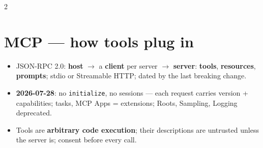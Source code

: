 \documentclass[8pt]{extarticle}
\newcommand\ct[1]{\texttt{#1}}
\begin{document}
\begin{multicols}{2}
\section{MCP — how tools plug in}
\begin{itemize}
  \item JSON-RPC 2.0: \textbf{host} $\to$ a \textbf{client} per server $\to$ \textbf{server}:
        \textbf{tools}, \textbf{resources}, \textbf{prompts}; stdio or Streamable HTTP; dated by
        the last breaking change.
  \item \textbf{2026-07-28}: no \ct{initialize}, no sessions — each request carries version +
        capabilities; tasks, MCP Apps = extensions; Roots, Sampling, Logging deprecated.
  \item Tools are \textbf{arbitrary code execution}; their descriptions are untrusted unless the
        server is; consent before every call.
\end{itemize}


\end{multicols}
\end{document}
